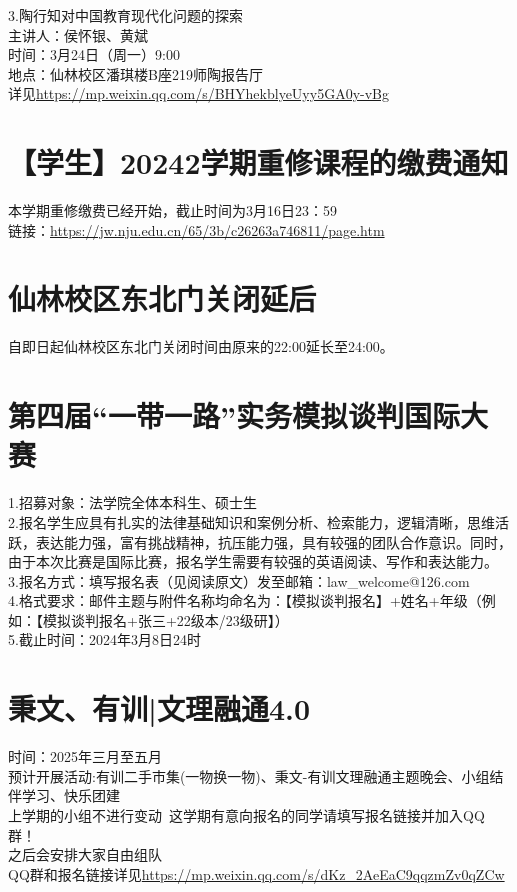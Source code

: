 \documentclass[letterpaper, 12pt]{article}
\begin{document}
\begin{multicols}{2}
3.陶行知对中国教育现代化问题的探索\\
主讲人：侯怀银、黄斌\\
时间：3月24日（周一）9:00\\
地点：仙林校区潘琪楼B座219师陶报告厅\\
详见\url{https://mp.weixin.qq.com/s/BHYhekblyeUyy5GA0y-vBg}
\section{【学生】20242学期重修课程的缴费通知}
本学期重修缴费已经开始，截止时间为3月16日23：59\\
链接：\url{https://jw.nju.edu.cn/65/3b/c26263a746811/page.htm}

\section{仙林校区东北门关闭延后}
自即日起仙林校区东北门关闭时间由原来的22:00延长至24:00。

\section{第四届“一带一路”实务模拟谈判国际大赛}
1.招募对象：法学院全体本科生、硕士生\\
2.报名学生应具有扎实的法律基础知识和案例分析、检索能力，逻辑清晰，思维活跃，表达能力强，富有挑战精神，抗压能力强，具有较强的团队合作意识。同时，由于本次比赛是国际比赛，报名学生需要有较强的英语阅读、写作和表达能力。\\
3.报名方式：填写报名表（见阅读原文）发至邮箱：law\_welcome@126.com\\
4.格式要求：邮件主题与附件名称均命名为：【模拟谈判报名】+姓名+年级（例如：【模拟谈判报名+张三+22级本/23级研】）\\
5.截止时间：2024年3月8日24时\\

\section{秉文、有训|文理融通4.0}
时间：2025年三月至五月\\
预计开展活动:有训二手市集(一物换一物)、秉文-有训文理融通主题晚会、小组结伴学习、快乐团建\\
上学期的小组不进行变动~这学期有意向报名的同学请填写报名链接并加入QQ群！\\
之后会安排大家自由组队~\\
QQ群和报名链接详见\url{https://mp.weixin.qq.com/s/dKz_2AeEaC9qqzmZv0qZCw}


\end{multicols}
\end{document}
